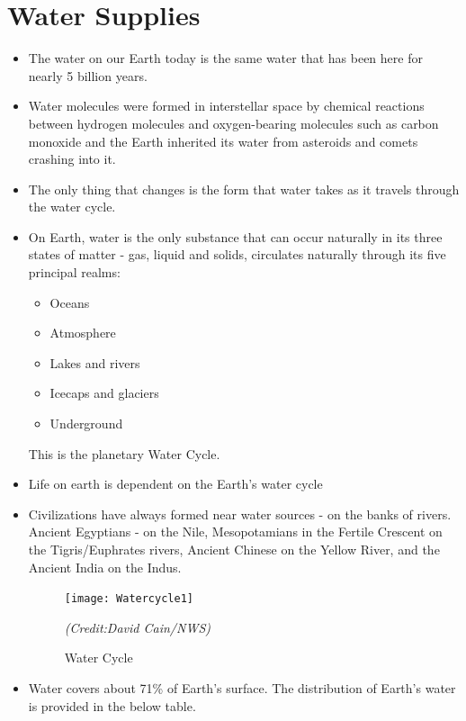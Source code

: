 \section{Water Supplies}
\begin{itemize}
\item The water on our Earth today is the same water that has been here for nearly 5 billion years.\\
\item Water molecules were formed in interstellar space by chemical reactions between hydrogen molecules and oxygen-bearing molecules such as carbon monoxide and the Earth inherited its water from asteroids and comets crashing into it.
\item The only thing that changes is the form that water takes as it travels through the water cycle.
\item On Earth, water is the only substance that can occur naturally in its three states of matter -  gas, liquid and solids, circulates naturally through its five principal realms:
\begin{itemize}
\item Oceans
\item Atmosphere
\item Lakes and rivers
\item Icecaps and glaciers
\item Underground
\end{itemize}
This is the planetary Water Cycle.
\item Life on earth is dependent on the Earth's water cycle
\item Civilizations have always formed near water sources - on the banks of rivers. Ancient Egyptians - on the Nile, Mesopotamians in the Fertile Crescent on the Tigris/Euphrates rivers, Ancient Chinese on the Yellow River, and the Ancient India on the Indus.
\newpage
\begin{figure}[]
\begin{center}
\texttt{[image: Watercycle1]}
\caption{Water Cycle}
\textit{(Credit:David Cain/NWS)}
\end{center}
\end{figure}
\item Water covers about 71\% of Earth's surface.  The distribution of Earth's water is provided in the below table.


\end{itemize}

